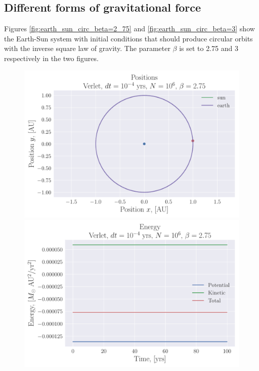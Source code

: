 \documentclass[reprint, english,notitlepage,nofootinbib]{revtex4-1}  %
\begin{document}
\subsection{Different forms of gravitational force}

Figures \ref{fig:earth_sun_circ_beta=2_75} and \ref{fig:earth_sun_circ_beta=3} show the Earth-Sun system with initial conditions that should produce circular orbits with the inverse square law of gravity. The parameter $\beta$ is set to 2.75 and 3 respectively in the two figures.

\begin{figure}[h]
	\centering
	\includegraphics[width=\linewidth]{../output/earth_sun_circ-verlet-4-6-2_75.pdf}
  \includegraphics[width=\linewidth]{../output/earth_sun_circ-verlet-4-6-2_75_energy.pdf}

\end{figure}
\end{document}
